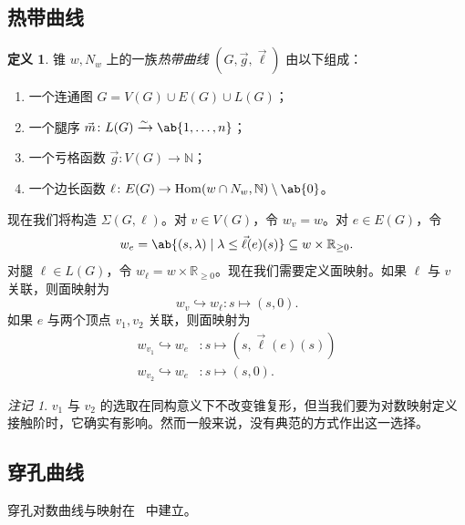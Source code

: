 \documentclass{amsart}
\theoremstyle{definition}
\newtheorem{defn}[thm]{定义}
\theoremstyle{remark}
\newtheorem{rmk}[thm]{注记}
\theoremstyle{plain}
\theoremstyle{definition}
\theoremstyle{remark}
\newcommand{\N}{\mathbb{N}}
\newcommand{\R}{\mathbb{R}}
\newcommand{\1}{\mathbf{1}}
\newcommand{\2}{\mathbf{2}}
\newcommand{\3}{\mathbf{3}}
\DeclareMathOperator{\Hom}{Hom}
\begin{document}
\subsection{热带曲线}%
\label{sub:Tropical curves}

\begin{defn}
    锥 \(w, N_w\) 上的一族\textit{热带曲线} \((G, \vec{g}, \vec{\ell})\) 由以下组成：
    \begin{enumerate}
        \item 一个连通图 \(G = V(G) \cup E(G) \cup L(G)\)；
        \item 一个腿序 \(\vec{m} \colon L(G) \xrightarrow{\sim} \ab\{1, \ldots, n\}\)；
        \item 一个亏格函数 \(\vec{g} \colon V(G) \to \N\)；
        \item 一个边长函数 \(\ell \colon E(G) \to \Hom(w \cap N_w, \N) \setminus \ab\{0\}\)。
    \end{enumerate}
\end{defn}

现在我们将构造 \(\Sigma(G, \ell)\)。对 \(v \in V(G)\)，令 \(w_v = w\)。对 \(e \in E(G)\)，令
\[ w_e = \ab\{ (s, \lambda) \mid \lambda \leq \vec{\ell}(e)(s) \} \subseteq w \times \R_{\geq 0}. \]
对腿 \(\ell \in L(G)\)，令 \(w_{\ell} = w \times \R_{\geq 0}\)。现在我们需要定义面映射。如果 \(\ell\) 与 \(v\) 关联，则面映射为
\[ w_v \hookrightarrow w_{\ell} \colon s \mapsto (s, 0). \]
如果 \(e\) 与两个顶点 \(v_1, v_2\) 关联，则面映射为
\begin{align*}
    w_{v_1} \hookrightarrow w_e &\colon s \mapsto (s, \vec{\ell}(e)(s)) \\
    w_{v_2} \hookrightarrow w_e & \colon s \mapsto (s, 0).
\end{align*}
\begin{rmk}
    \(v_1\) 与 \(v_2\) 的选取在同构意义下不改变锥复形，但当我们要为对数映射定义接触阶时，它确实有影响。然而一般来说，没有典范的方式作出这一选择。
\end{rmk}

\subsection{穿孔曲线}%
\label{sub:Punctured curves}

穿孔对数曲线与映射在~\cite{ACGS2025} 中建立。
\end{document}
